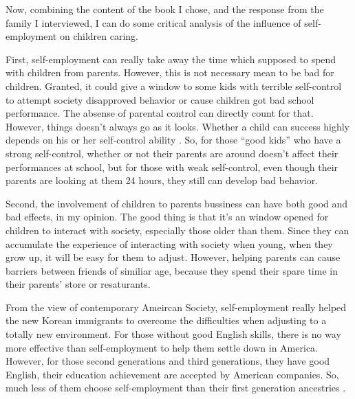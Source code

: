 Now, combining the content of the book I chose, and the response from the family
I interviewed, I can do some critical analysis of the influence of
self-employment on children caring.
\par
First, self-employment can really take away the time which supposed to spend
with children from parents. However, this is not necessary mean to be bad for
children. Granted, it could give a window to some kids with terrible
self-control to attempt society disapproved behavior or cause children got bad
school performance. The absense of parental control can directly count for that.
However, things doesn't always go as it looks. Whether a child can success
highly depends on his or her self-control ability \cite{article:SelfControl}.
So, for those ``good kids'' who have a strong self-control, whether or not their
parents are around doesn't affect their performances at school, but for those
with weak self-control, even though their parents are looking at them 24 hours,
they still can develop bad behavior.
\par
Second, the involvement of children to parents bussiness can have both good and
bad effects, in my opinion. The good thing is that it's an window opened for
children to interact with society, especially those older than them. Since they
can accumulate the experience of interacting with society when young, when they
grow up, it will be easy for them to adjust. However, helping parents can cause
barriers between friends of similiar age, because they spend their spare time in
their parents' store or resaturants. 
\par
From the view of contemporary Ameircan Society, self-employment really helped
the new Korean immigrants to overcome the difficulties when adjusting to a
totally new environment. For those without good English skills, there is no way
more effective than self-employment to help them settle down in America.
However, for those second generations and third generations, they have good
English, their education achievement are accepted by American companies. So,
much less of them choose self-employment than their first generation ancestries
\cite{online:SecondGenerationSelfEmployment}.

